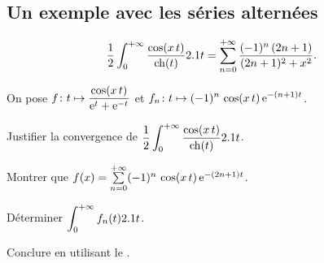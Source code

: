 \subsection{Un exemple avec les séries alternées}


\begin{prop}
\[
\frac{1}{2} \int_{0}^{+ \infty} \frac{\cos (x \, t)}{\ch(t)} \d t = \sum_{n=0}^{+ \infty} \frac{(-1)^n \, (2n+1)}{(2n+1)^2 + x^2}.
\]
\end{prop}

\begin{exercice}
On pose $\displaystyle \fonctionligne[f]{t}{\frac{\cos(x \, t)}{\e^t + \e^{-t}}}$ et $\displaystyle \fonctionligne[f_n]{t}{(-1)^n \, \cos(x \, t) \, \e^{-(n + 1) t}}$.
\begin{questions}
\item Justifier la convergence de $\displaystyle\frac{1}{2} \int_{0}^{+ \infty} \frac{\cos (x \, t)}{\ch(t)} \d t$.

\item Montrer que $f(x) = \sum\limits_{n=0}^{+\infty} (-1)^n \, \cos(x \, t) \, \e^{-(2 n + 1) t}$.

\item Déterminer $\displaystyle\int_0^{+\infty} f_n(t) \d t$.

\item Conclure en utilisant le .
\end{questions}
\end{exercice}

